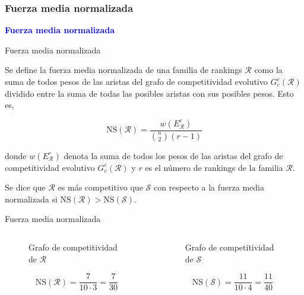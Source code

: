 \documentclass[10pt]{beamer}
\begin{document}
	\subsubsection{Fuerza media normalizada}
	
	\begin{frame}
		\begin{center}
			\Huge\textbf{\textsf{\textcolor{blue}{Fuerza media normalizada}}}
		\end{center}
	\end{frame}
	
	\begin{frame}{Fuerza media normalizada}
		\begin{defi}
			Se define la fuerza media normalizada de una familia de rankings $\mathcal{R}$ como la suma de todos pesos de las aristas del grafo de competitividad evolutivo $G_c^e(\mathcal{R})$ dividido entre la suma de todas las posibles aristas con sus posibles pesos. Esto es,
			
			\begin{equation}
			\mathrm{NS}(\mathcal{R}) = \dfrac{w(E_\mathcal{R}^e)}{\binom{n}{2} (r-1)}
			\end{equation} 
			
			donde $w(E_\mathcal{R}^e)$ denota la suma de todos los pesos de las aristas del grafo de competitividad evolutivo $G_c^e(\mathcal{R})$ y $r$ es el número de rankings de la familia $\mathcal{R}$.
		\end{defi}
		
		\begin{defi}
			Se dice que $\mathcal{R}$ es más competitivo que $\mathcal{S}$ con respecto a la fuerza media normalizada si $\mathrm{NS}(\mathcal{R}) > \mathrm{NS}(\mathcal{S})$.
		\end{defi}
	\end{frame}
	
	\begin{frame}{Fuerza media normalizada}
		\begin{ejemplo}
			\begin{columns}[t] %
				\begin{column}{.50\textwidth}
					\begin{figure}
						\centering
						\resizebox{!}{0.3\textheight}{\ejemplografocompetitividadevolutivo}
						\caption{Grafo de competitividad de $\mathcal{R}$}
					\end{figure}
					\[ \mathrm{NS}(\mathcal{R}) = \dfrac{7}{10 \cdot 3} = \dfrac{7}{30} \]
				\end{column}%
				\hfill%
				\begin{column}{.50\textwidth}
					\begin{figure}
						\centering
						\resizebox{!}{0.3\textheight}{\ejemplofuerzamedia}
						\caption{Grafo de competitividad de $\mathcal{S}$}
					\end{figure}
					\[ \mathrm{NS}(\mathcal{S}) = \dfrac{11}{10\cdot 4} = \dfrac{11}{40} \]
				\end{column}%
			\end{columns}
		\end{ejemplo}
	\end{frame}
	
\end{document}
